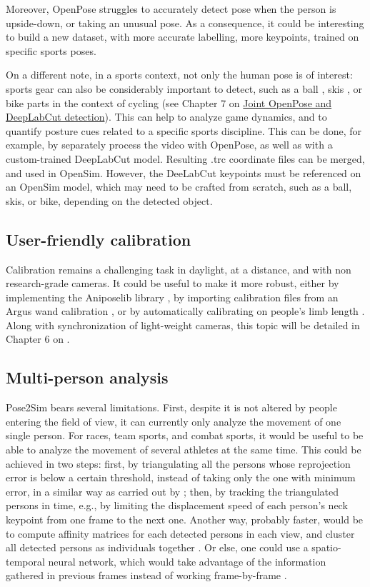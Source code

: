 Moreover, OpenPose struggles to accurately detect pose when the person is upside-down, or taking an unusual pose. As a consequence, it could be interesting to build a new dataset, with more accurate labelling, more keypoints, trained on specific sports poses.

On a different note, in a sports context, not only the human pose is of interest: sports gear can also be considerably important to detect, such as a ball \cite{Ghasemzadeh2021}, skis \cite{Ludwig2020}, or bike parts in the context of cycling (see Chapter 7 on \hyperref[ch:7]{Joint OpenPose and DeepLabCut detection}). This can help to analyze game dynamics, and to quantify posture cues related to a specific sports discipline. This can be done, for example, by separately process the video with OpenPose, as well as with a custom-trained DeepLabCut model. Resulting .trc coordinate files can be merged, and used in OpenSim. However, the DeeLabCut keypoints must be referenced on an OpenSim model, which may need to be crafted from scratch, such as a ball, skis, or bike, depending on the detected object.


\subsection{User-friendly calibration}

Calibration remains a challenging task in daylight, at a distance, and with non research-grade cameras. It could be useful to make it more robust, either by implementing the Aniposelib library \cite{Karashchuk2020}, by importing calibration files from an Argus wand calibration \cite{Argus}, or by automatically calibrating on people’s limb length \cite{Liu2022a}. Along with synchronization of light-weight cameras, this topic will be detailed in Chapter 6 on  \cite{Pagnon2022c}.


\subsection{Multi-person analysis}

Pose2Sim bears several limitations. First, despite it is not altered by people entering the field of view, it can currently only analyze the movement of one single person. For races, team sports, and combat sports, it would be useful to be able to analyze the movement of several athletes at the same time. This could be achieved in two steps: first, by triangulating all the persons whose reprojection error is below a certain threshold, instead of taking only the one with minimum error, in a similar way as carried out by \cite{Slembrouck2020}; then, by tracking the triangulated persons in time, e.g., by limiting the displacement speed of each person’s neck keypoint from one frame to the next one. Another way, probably faster, would be to compute affinity matrices for each detected persons in each view, and cluster all detected persons as individuals together \cite{Dong2019}. Or else, one could use a spatio-temporal neural network, which would take advantage of the information gathered in previous frames instead of working frame-by-frame \cite{Raaj2019}.


